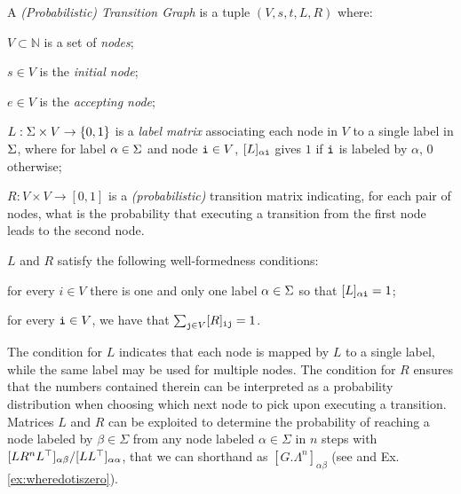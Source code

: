 \begin{definition} A \emph{(Probabilistic) Transition Graph} is a tuple $(V,s,t,L,R)$ where:
  \begin{inparaenum}[\itshape (i)]
    \item $V \subset \mathbb{N}$ is a set of \emph{nodes};
    \item $s\in V$ is the \emph{initial node};
    \item $e\in V$ is the \emph{accepting node};
    \item $L: \Sigma \times V \rightarrow \{0,1\}$ is a \emph{label matrix} associating each node in $V$ to a single label in $\Sigma$, where for label $\alpha \in \Sigma$ and node $\textnormal{\texttt{i}} \in V$, $[L]_{\alpha\textnormal{\texttt{i}}}$ gives $1$ if $\textnormal{\texttt{i}}$ is labeled by $\alpha$, $0$ otherwise;
    \item $R: V \times V \rightarrow [0,1]$ is a \emph{(probabilistic)} transition matrix indicating, for each pair of nodes, what is the probability that executing a transition from the first node leads to the second node.
  \end{inparaenum}
$L$ and $R$ satisfy the following well-formedness conditions:
\begin{inparaenum}[\itshape (i)]
\item for every $i \in V$ there is one and only one label $\alpha \in \Sigma$ so   that $[L]_{\alpha\textnormal{\texttt{i}}}=1$;
\item  for  every $\textnormal{\texttt{i}} \in V$, we have that $\sum_{\textnormal{\texttt{j}}\in V}[R]_{\textnormal{\texttt{ij}}}=1$.
\end{inparaenum}
\end{definition}
The condition for $L$ indicates that each node is mapped by $L$ to a single label, while the same label may be used for multiple nodes. The condition for $R$ ensures that the numbers contained therein can be interpreted as a probability distribution when choosing which next node to pick upon executing a transition. Matrices $L$ and $R$ can be exploited to determine the probability of reaching a node labeled by $\beta\in\Sigma$ from any node labeled $\alpha\in\Sigma$ in $n$ steps with $[LR^nL^\top]_{\alpha\beta}/[LL^\top]_{\alpha\alpha}$, that we can shorthand as $[G.\Lambda^n]_{\alpha\beta}$ (see \cite{GartnerFW03} and Ex. \ref{ex:wheredotiszero}).


